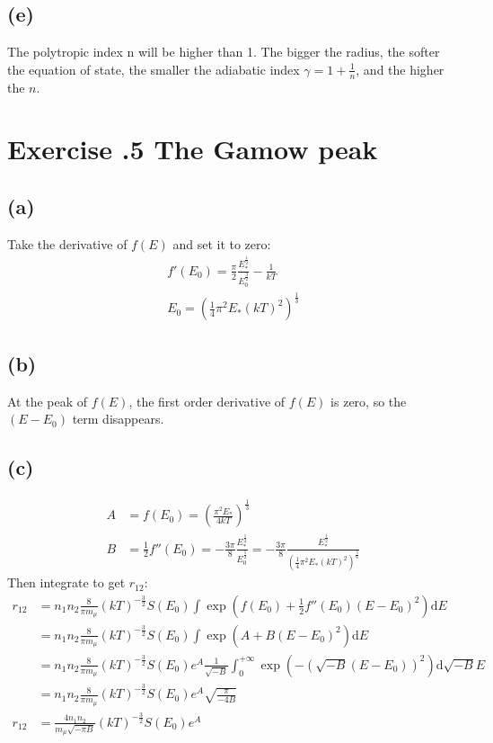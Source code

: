 \documentclass[a4paper,12pt]{article}
\renewcommand{\d}{\mathrm{d}}
\begin{document}
\subsection*{(e)}
The polytropic index n will be higher than 1. The bigger the radius, the softer the equation of state, 
the smaller the adiabatic index $\gamma = 1 + \frac{1}{n}$, and the higher the $n$.


\section*{\textbf{Exercise \uppercase\expandafter{}.5 The Gamow peak}}
\subsection*{(a)}
Take the derivative of $f(E)$ and set it to zero:
\begin{align*}
    f'(E_0) = \frac{\pi}{2} \frac{E_*^{\frac{1}{2}}}{E_0^{\frac{3}{2}}} - \frac{1}{kT}\\
    E_0 = (\frac{1}{4} \pi^2 E_* (kT)^2)^{\frac{1}{3}}
\end{align*}

\subsection*{(b)}
At the peak of $f(E)$, the first order derivative of $f(E)$ is zero, so the $(E - E_0)$ term disappears.

\subsection*{(c)}
\begin{align*}
    A &= f(E_0) = (\frac{\pi^2 E_*}{4kT})^{\frac{1}{3}} \\
    B &= \frac{1}{2} f''(E_0) = -\frac{3\pi}{8} \frac{E_*^{\frac{1}{2}}}{E_0^{\frac{5}{2}}}
     = -\frac{3\pi}{8} \frac{E_*^{\frac{1}{2}}}{(\frac{1}{4} \pi^2 E_* (kT)^2)^{\frac{5}{6}}}
\end{align*}
Then integrate to get $r_{12}$:
\begin{align*}
    r_{12} &= n_1 n_2 \frac{8}{\pi m_\mu} (kT)^{-\frac{3}{2}} S(E_0) \int \exp(f(E_0) + \frac{1}{2} f''(E_0) (E-E_0)^2) \d E\\
    &= n_1 n_2 \frac{8}{\pi m_\mu} (kT)^{-\frac{3}{2}} S(E_0) \int \exp(A + B (E-E_0)^2) \d E\\
    &= n_1 n_2 \frac{8}{\pi m_\mu} (kT)^{-\frac{3}{2}} S(E_0) e^A \frac{1}{\sqrt{-B}} \int_0^{+\infty} \exp(- (\sqrt{-B}(E-E_0))^2) \d \sqrt{-B} E\\
    &= n_1 n_2 \frac{8}{\pi m_\mu} (kT)^{-\frac{3}{2}} S(E_0) e^A \sqrt{\frac{\pi}{-4B}} \\
    r_{12}&= \frac{4n_1 n_2}{m_\mu \sqrt{- \pi B}} (kT)^{-\frac{3}{2}} S(E_0) e^A
\end{align*}
\end{document}
